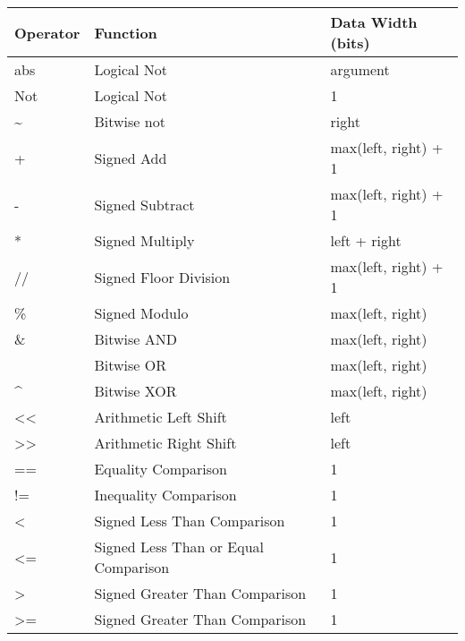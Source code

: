 \documentclass[letterpaper,10pt,english]{sphinxmanual}
\begin{document}
\begin{tabulary}{\linewidth}{|L|L|L|}
\hline
\textbf{
Operator
} & \textbf{
Function
} & \textbf{
Data Width (bits)
}\\
\hline

abs
 & 
Logical Not
 & 
argument
\\

Not
 & 
Logical Not
 & 
1
\\

\textasciitilde{}
 & 
Bitwise not
 & 
right
\\

+
 & 
Signed Add
 & 
max(left, right) + 1
\\

-
 & 
Signed Subtract
 & 
max(left, right) + 1
\\

*
 & 
Signed Multiply
 & 
left + right
\\

//
 & 
Signed Floor Division
 & 
max(left, right) + 1
\\

\%
 & 
Signed Modulo
 & 
max(left, right)
\\

\&
 & 
Bitwise AND
 & 
max(left, right)
\\

\textbar{}
 & 
Bitwise OR
 & 
max(left, right)
\\

\textasciicircum{}
 & 
Bitwise XOR
 & 
max(left, right)
\\

\textless{}\textless{}
 & 
Arithmetic Left Shift
 & 
left
\\

\textgreater{}\textgreater{}
 & 
Arithmetic Right Shift
 & 
left
\\

==
 & 
Equality Comparison
 & 
1
\\

!=
 & 
Inequality Comparison
 & 
1
\\

\textless{}
 & 
Signed Less Than
Comparison
 & 
1
\\

\textless{}=
 & 
Signed Less Than or Equal
Comparison
 & 
1
\\

\textgreater{}
 & 
Signed Greater Than
Comparison
 & 
1
\\

\textgreater{}=
 & 
Signed Greater Than
Comparison
 & 
1
\\
\hline
\end{tabulary}
\end{document}
